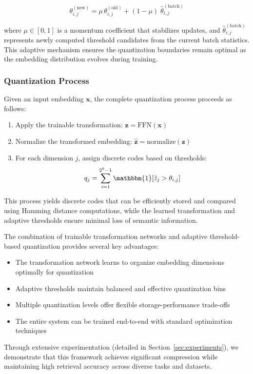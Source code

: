 \begin{equation}
    \theta_{i,j}^{(\text{new})} = \mu\,\theta_{i,j}^{(\text{old})} + (1-\mu)\;\widehat{\theta}_{i,j}^{(\text{batch})}
\end{equation}

where $\mu \in [0,1]$ is a momentum coefficient that stabilizes updates, and $\widehat{\theta}_{i,j}^{(\text{batch})}$ represents newly computed threshold candidates from the current batch statistics. This adaptive mechanism ensures the quantization boundaries remain optimal as the embedding distribution evolves during training.

\subsubsection{Quantization Process}
Given an input embedding $\mathbf{x}$, the complete quantization process proceeds as follows:

\begin{enumerate}
    \item Apply the trainable transformation: $\mathbf{z} = \text{FFN}(\mathbf{x})$
    \item Normalize the transformed embedding: $\hat{\mathbf{z}} = \text{normalize}(\mathbf{z})$
    \item For each dimension $j$, assign discrete codes based on thresholds:
    \begin{equation}
        q_j = \sum_{i=1}^{2^k-1} \mathbbm{1}[\hat{z}_j > \theta_{i,j}]
    \end{equation}
\end{enumerate}

This process yields discrete codes that can be efficiently stored and compared using Hamming distance computations, while the learned transformation and adaptive thresholds ensure minimal loss of semantic information.

The combination of trainable transformation networks and adaptive threshold-based quantization provides several key advantages:

\begin{itemize}
    \item The transformation network learns to organize embedding dimensions optimally for quantization
    \item Adaptive thresholds maintain balanced and effective quantization bins
    \item Multiple quantization levels offer flexible storage-performance trade-offs
    \item The entire system can be trained end-to-end with standard optimization techniques
\end{itemize}

Through extensive experimentation (detailed in Section~\ref{sec:experiments}), we demonstrate that this framework achieves significant compression while maintaining high retrieval accuracy across diverse tasks and datasets.
